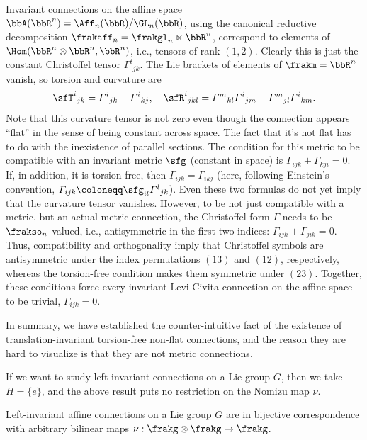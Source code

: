 \begin{example}
    Invariant connections on the affine space $\bbA(\bbR^n)=\Aff_n(\bbR)\slash \GL_n(\bbR)$, using the canonical reductive decomposition $\frakaff_n=\frakgl_n\ltimes \bbR^n$, correspond to elements of $\Hom(\bbR^n\otimes \bbR^n,\bbR^n)$, i.e., tensors of rank $(1,2)$. Clearly this is just the constant Christoffel tensor $\varGamma^i{}_{jk}$. The Lie brackets of elements of $\frakm=\bbR^n$ vanish, so torsion and curvature are 
    \[\sfT^i{}_{jk}=\varGamma^i{}_{jk}-\varGamma^i{}_{kj},\quad \sfR^i{}_{jkl}=\varGamma^m{}_{kl}\varGamma^i{}_{jm}-\varGamma^m{}_{jl}\varGamma^i{}_{km}.\] 
    Note that this curvature tensor is not zero even though the connection appears ``flat'' in the sense of being constant across space. The fact that it's not flat has to do with the inexistence of parallel sections. The condition for this metric to be compatible with an invariant metric $\sfg$ (constant in space) is $\varGamma_{ijk}+\varGamma_{kji}=0$. If, in addition, it is torsion-free, then $\varGamma_{ijk}=\varGamma_{ikj}$ (here, following Einstein's convention, $\varGamma_{ijk}\coloneqq \sfg_{il}\varGamma^l{}_{jk}$). Even these two formulas do not yet imply that the curvature tensor vanishes. However, to be not just compatible with a metric, but an actual metric connection, the Christoffel form $\varGamma$ needs to be $\frakso_n$-valued, i.e., antisymmetric in the first two indices: $\varGamma_{ijk}+\varGamma_{jik}=0$. Thus, compatibility and orthogonality imply that Christoffel symbols are antisymmetric under the index permutations $(13)$ and $(12)$, respectively, whereas the torsion-free condition makes them symmetric under $(23)$. Together, these conditions force every invariant Levi-Civita connection on the affine space to be trivial, $\varGamma_{ijk}=0$.

    In summary, we have established the counter-intuitive fact of the existence of translation-invariant torsion-free non-flat connections, and the reason they are hard to visualize is that they are not metric connections.
\end{example}

If we want to study left-invariant connections on a Lie group $G$, then we take $H=\{e\}$, and the above result puts no restriction on the Nomizu map $\nu$.

\begin{cor}
    Left-invariant affine connections on a Lie group $G$ are in bijective correspondence with arbitrary bilinear maps $\nu:\frakg\otimes\frakg\to \frakg$.
\end{cor}

